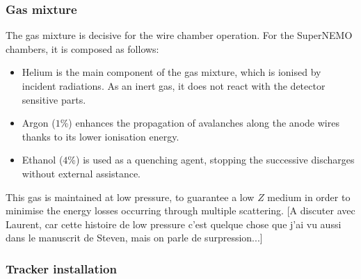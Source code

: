 \subsubsection*{Gas mixture}

The gas mixture is decisive for the wire chamber operation.
For the SuperNEMO chambers, it is composed as follows:
\begin{itemize}
\item Helium is the main component of the gas mixture, which is ionised by incident radiations. As an inert gas, it does not react with the detector sensitive parts.
\item Argon ($1$\%) enhances the propagation of avalanches along the anode wires thanks to its lower ionisation energy.
\item Ethanol ($4$\%) is used as a quenching agent, stopping the successive discharges without external assistance.
\end{itemize}
This gas is maintained at low pressure, to guarantee a low $Z$ medium in order to minimise the energy losses occurring through multiple scattering.
[A discuter avec Laurent, car cette histoire de low pressure c'est quelque chose que j'ai vu aussi dans le manuscrit de Steven, mais on parle de surpression...]

\subsubsection*{Tracker installation}


